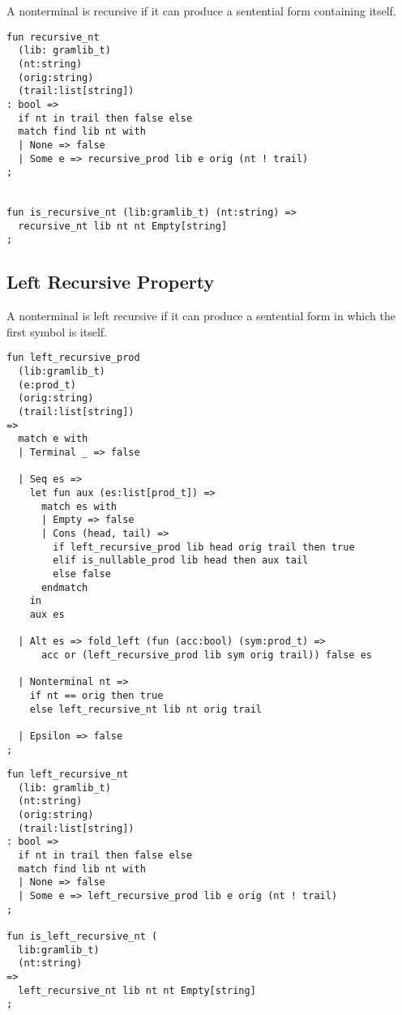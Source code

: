 \documentclass[oneside]{book}
\begin{document}
A nonterminal is recursive if it can produce a sentential
form containing itself.

\begin{verbatim}
fun recursive_nt
  (lib: gramlib_t) 
  (nt:string) 
  (orig:string) 
  (trail:list[string]) 
: bool =>
  if nt in trail then false else
  match find lib nt with
  | None => false
  | Some e => recursive_prod lib e orig (nt ! trail)
;


fun is_recursive_nt (lib:gramlib_t) (nt:string) =>
  recursive_nt lib nt nt Empty[string]
;
\end{verbatim}

\subsection{Left Recursive Property}
A nonterminal is left recursive if it can produce a sentential
form in which the first symbol is itself.

\begin{verbatim}
fun left_recursive_prod 
  (lib:gramlib_t) 
  (e:prod_t) 
  (orig:string) 
  (trail:list[string]) 
=>
  match e with
  | Terminal _ => false

  | Seq es =>
    let fun aux (es:list[prod_t]) =>
      match es with
      | Empty => false
      | Cons (head, tail) => 
        if left_recursive_prod lib head orig trail then true
        elif is_nullable_prod lib head then aux tail
        else false
      endmatch
    in
    aux es

  | Alt es => fold_left (fun (acc:bool) (sym:prod_t) => 
      acc or (left_recursive_prod lib sym orig trail)) false es

  | Nonterminal nt => 
    if nt == orig then true 
    else left_recursive_nt lib nt orig trail

  | Epsilon => false 
;
\end{verbatim}

\begin{verbatim}
fun left_recursive_nt 
  (lib: gramlib_t) 
  (nt:string) 
  (orig:string) 
  (trail:list[string]) 
: bool =>
  if nt in trail then false else
  match find lib nt with
  | None => false
  | Some e => left_recursive_prod lib e orig (nt ! trail)
;

fun is_left_recursive_nt (
  lib:gramlib_t) 
  (nt:string) 
=>
  left_recursive_nt lib nt nt Empty[string]
;
\end{verbatim}
\end{document}
